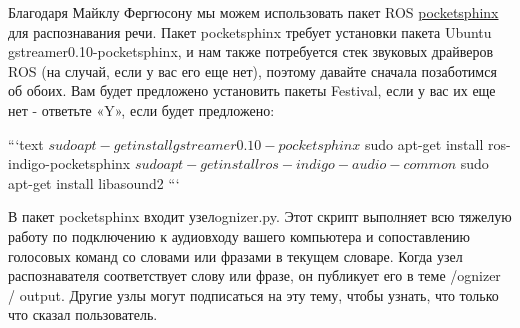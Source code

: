 

Благодаря Майклу Фергюсону мы можем использовать пакет ROS \href{http://wiki.ros.org/pocketsphinx}{pocketsphinx} для распознавания речи. Пакет pocketsphinx требует установки пакета Ubuntu gstreamer0.10-pocketsphinx, и нам также потребуется стек звуковых драйверов ROS (на случай, если у вас его еще нет), поэтому давайте сначала позаботимся об обоих. Вам будет предложено установить пакеты Festival, если у вас их еще нет - ответьте «Y», если будет предложено:

```text
$ sudo apt-get install gstreamer0.10-pocketsphinx 
$ sudo apt-get install ros-indigo-pocketsphinx
$ sudo apt-get install ros-indigo-audio-common
$ sudo apt-get install libasound2
```

В пакет pocketsphinx входит узелognizer.py. Этот скрипт выполняет всю тяжелую работу по подключению к аудиовходу вашего компьютера и сопоставлению голосовых команд со словами или фразами в текущем словаре. Когда узел распознавателя соответствует слову или фразе, он публикует его в теме /ognizer / output. Другие узлы могут подписаться на эту тему, чтобы узнать, что только что сказал пользователь.


